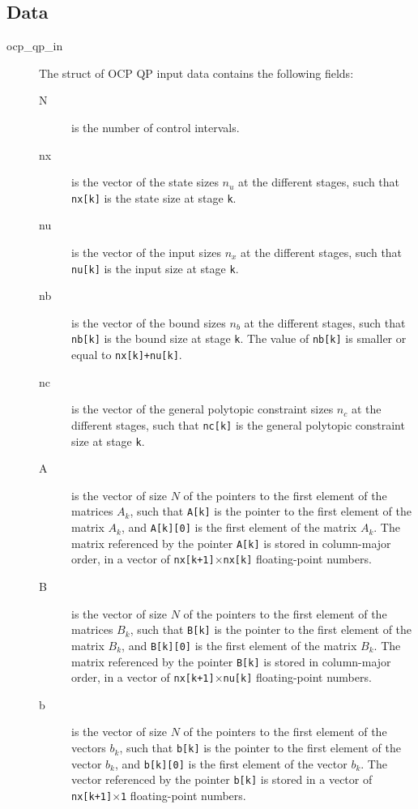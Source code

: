 \documentclass{report}
\begin{document}
\subsection{Data}
\label{sec:OCP_QP_interface_data}
\begin{description}
	\item[ocp\_qp\_in] The struct of OCP QP input data contains the following fields:
	\begin{description}
		\item[N] is the number of control intervals.
		\item[nx] is the vector of the state sizes $n_u$ at the different stages, such that \texttt{nx[k]} is the state size at stage \texttt{k}.
		\item[nu] is the vector of the input sizes $n_x$ at the different stages, such that \texttt{nu[k]} is the input size at stage \texttt{k}.
		\item[nb] is the vector of the bound sizes $n_b$ at the different stages, such that \texttt{nb[k]} is the bound size at stage \texttt{k}.
		The value of \texttt{nb[k]} is smaller or equal to \texttt{nx[k]+nu[k]}.
		\item[nc] is the vector of the general polytopic constraint sizes $n_c$ at the different stages, such that \texttt{nc[k]} is the general polytopic constraint size at stage \texttt{k}.
		\item[A] is the vector of size $N$ of the pointers to the first element of the matrices $A_k$, such that \texttt{A[k]} is the pointer to the first element of the matrix $A_k$, and \texttt{A[k][0]} is the first element of the matrix $A_k$.
		The matrix referenced by the pointer \texttt{A[k]} is stored in column-major order, in a vector of \texttt{nx[k+1]$\times$nx[k]} floating-point numbers.
		\item[B] is the vector of size $N$ of the pointers to the first element of the matrices $B_k$, such that \texttt{B[k]} is the pointer to the first element of the matrix $B_k$, and \texttt{B[k][0]} is the first element of the matrix $B_k$.
		The matrix referenced by the pointer \texttt{B[k]} is stored in column-major order, in a vector of \texttt{nx[k+1]$\times$nu[k]} floating-point numbers.
		\item[b] is the vector of size $N$ of the pointers to the first element of the vectors $b_k$, such that \texttt{b[k]} is the pointer to the first element of the vector $b_k$, and \texttt{b[k][0]} is the first element of the vector $b_k$.
		The vector referenced by the pointer \texttt{b[k]} is stored in a vector of \texttt{nx[k+1]$\times$1} floating-point numbers.

\end{description}
\end{description}
\end{document}
